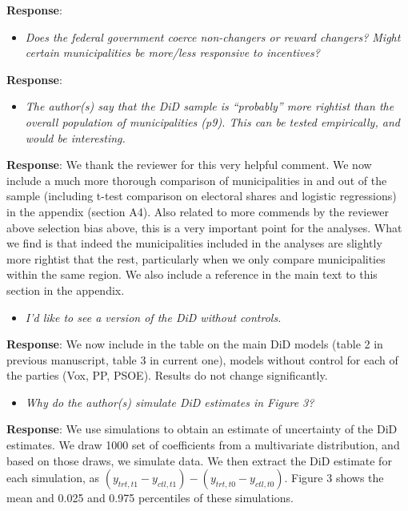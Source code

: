 \documentclass[12pt, a4paper, notitlepage]{article}
\begin{document}
\textbf{Response}: {}

\begin{itemize}
  \item \textit{Does the federal government coerce non-changers or reward changers? Might certain
  municipalities be more/less responsive to incentives?}
\end{itemize}

\textbf{Response}: {}

\begin{itemize}
  \item \textit{The author(s) say that the DiD sample is “probably” more rightist than the overall
  population of municipalities (p9). This can be tested empirically, and would be
  interesting.}
\end{itemize}

\textbf{Response}: We thank the reviewer for this very helpful comment. We now include a much more thorough comparison of municipalities in and out of the sample (including t-test comparison on electoral shares and logistic regressions) in the appendix (section A4). Also related to more commends by the reviewer above selection bias above, this is a very important point for the analyses. What we find is that indeed the municipalities included in the analyses are slightly more rightist that the rest, particularly when we only compare municipalities within the same region.
We also include a reference in the main text to this section in the appendix.

\begin{itemize}
  \item \textit{I’d like to see a version of the DiD without controls.}
\end{itemize}

\textbf{Response}: We now include in the table on the main DiD models (table 2 in previous manuscript, table 3 in current one), models without control for each of the parties (Vox, PP, PSOE). Results do not change significantly.

\begin{itemize}
  \item \textit{Why do the author(s) simulate DiD estimates in Figure 3?}
\end{itemize}

\textbf{Response}: We use simulations to obtain an estimate of uncertainty of the DiD estimates. We draw 1000 set of coefficients from a multivariate distribution, and based on those draws, we simulate data. We then extract the DiD estimate for each simulation, as $(y_{trt, t1} - y_{ctl, t1})-(y_{trt, t0} - y_{ctl, t0})$.
Figure 3 shows the mean and 0.025 and 0.975 percentiles of these simulations.
\end{document}
